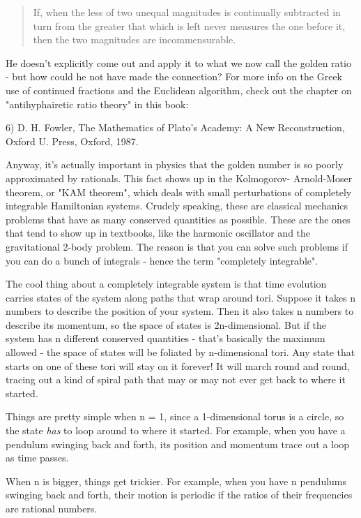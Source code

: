 \begin{quote}
 If, when the less of two unequal magnitudes is continually subtracted 
 in turn from the greater that which is left never measures the one 
 before it, then the two magnitudes are incommensurable.
\end{quote}
    
He doesn't explicitly come out and apply it to what we now call the golden 
ratio - but how could he not have made the connection?  For more info on 
the Greek use of continued fractions and the Euclidean algorithm, check 
out the chapter on "antihyphairetic ratio theory" in this book:

6) D. H. Fowler, The Mathematics of Plato's Academy: A New Reconstruction,
Oxford U. Press, Oxford, 1987.

Anyway, it's actually important in physics that the golden number is so 
poorly approximated by rationals.   This fact shows up in the Kolmogorov-
Arnold-Moser theorem, or "KAM theorem", which deals with small perturbations 
of completely integrable Hamiltonian systems.  Crudely speaking, these are 
classical mechanics problems that have as many conserved quantities as 
possible.  These are the ones that tend to show up in textbooks, like the 
harmonic oscillator and the gravitational 2-body problem.   The reason is 
that you can solve such problems if you can do a bunch of integrals - hence 
the term "completely integrable".

The cool thing about a completely integrable system is that time evolution 
carries states of the system along paths that wrap around tori.  Suppose it 
takes n numbers to describe the position of your system.  Then it also takes 
n numbers to describe its momentum, so the space of states is 2n-dimensional.
But if the system has n different conserved quantities - that's basically the
maximum allowed - the space of states will be foliated by n-dimensional tori.   
Any state that starts on one of these tori will stay on it forever!  It will 
march round and round, tracing out a kind of spiral path that may or may not 
ever get back to where it started.

Things are pretty simple when n = 1, since a 1-dimensional torus is a 
circle, so the state \emph{has} 
to loop around to where it started.  For example, 
when you have a pendulum swinging back and forth, its position and momentum 
trace out a loop as time passes.  

When n is bigger, things get trickier.  For example, when you have n 
pendulums swinging back and forth, their motion is periodic if the 
ratios of their frequencies are rational numbers.  


